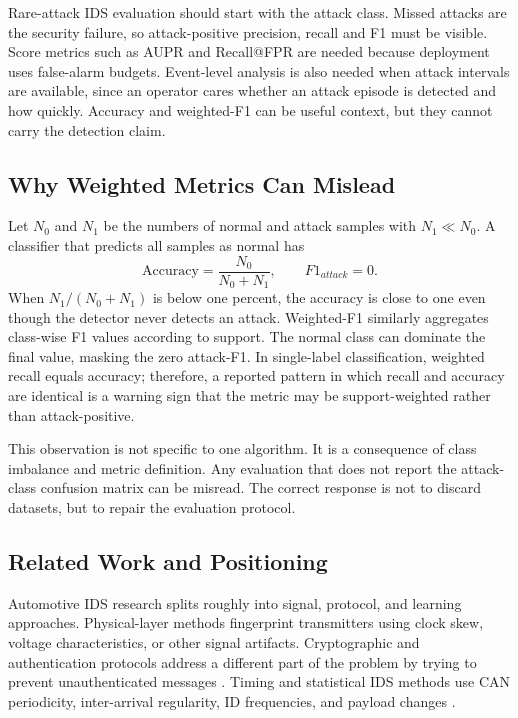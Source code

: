 \documentclass[runningheads]{llncs}%
\begin{document}
Rare-attack IDS evaluation should start with the attack class.  Missed attacks are the security failure, so attack-positive precision, recall and F1 must be visible.  Score metrics such as AUPR and Recall@FPR are needed because deployment uses false-alarm budgets.  Event-level analysis is also needed when attack intervals are available, since an operator cares whether an attack episode is detected and how quickly.  Accuracy and weighted-F1 can be useful context, but they cannot carry the detection claim.

\subsection{Why Weighted Metrics Can Mislead}
Let $N_0$ and $N_1$ be the numbers of normal and attack samples with $N_1 \ll N_0$.  A classifier that predicts all samples as normal has
\begin{equation}
    \mathrm{Accuracy}=\frac{N_0}{N_0+N_1}, \qquad F1_{attack}=0.
\end{equation}
When $N_1/(N_0+N_1)$ is below one percent, the accuracy is close to one even though the detector never detects an attack.  Weighted-F1 similarly aggregates class-wise F1 values according to support.  The normal class can dominate the final value, masking the zero attack-F1.  In single-label classification, weighted recall equals accuracy; therefore, a reported pattern in which recall and accuracy are identical is a warning sign that the metric may be support-weighted rather than attack-positive.

This observation is not specific to one algorithm.  It is a consequence of class imbalance and metric definition.  Any evaluation that does not report the attack-class confusion matrix can be misread.  The correct response is not to discard datasets, but to repair the evaluation protocol.

\subsection{Related Work and Positioning}
Automotive IDS research splits roughly into signal, protocol, and learning approaches.  Physical-layer methods fingerprint transmitters using clock skew, voltage characteristics, or other signal artifacts.  Cryptographic and authentication protocols address a different part of the problem by trying to prevent unauthenticated messages \cite{cho2016fingerprinting,cho2017viden,lu2019leap,lotto2024survey}.  Timing and statistical IDS methods use CAN periodicity, inter-arrival regularity, ID frequencies, and payload changes \cite{song2016intrusion,tyree2018shape}.
\end{document}
